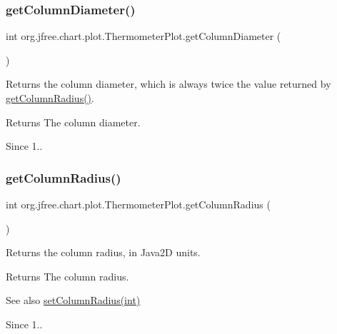 \subsubsection{\texorpdfstring{get\+Column\+Diameter()}{getColumnDiameter()}}
{\footnotesize\ttfamily int org.\+jfree.\+chart.\+plot.\+Thermometer\+Plot.\+get\+Column\+Diameter (\begin{DoxyParamCaption}{ }\end{DoxyParamCaption})}

Returns the column diameter, which is always twice the value returned by \mbox{\hyperlink{classorg_1_1jfree_1_1chart_1_1plot_1_1_thermometer_plot_a74b63300dd2a147c902542e3b3c98085}{get\+Column\+Radius()}}.

\begin{DoxyReturn}{Returns}
The column diameter.
\end{DoxyReturn}
\begin{DoxySince}{Since}
1.. 
\end{DoxySince}
\mbox{\label{classorg_1_1jfree_1_1chart_1_1plot_1_1_thermometer_plot_a74b63300dd2a147c902542e3b3c98085}} 
\subsubsection{\texorpdfstring{get\+Column\+Radius()}{getColumnRadius()}}
{\footnotesize\ttfamily int org.\+jfree.\+chart.\+plot.\+Thermometer\+Plot.\+get\+Column\+Radius (\begin{DoxyParamCaption}{ }\end{DoxyParamCaption})}

Returns the column radius, in Java2D units.

\begin{DoxyReturn}{Returns}
The column radius.
\end{DoxyReturn}
\begin{DoxySeeAlso}{See also}
\mbox{\hyperlink{classorg_1_1jfree_1_1chart_1_1plot_1_1_thermometer_plot_abdca1e8b671c03e4cfa948b622a93b29}{set\+Column\+Radius(int)}}
\end{DoxySeeAlso}
\begin{DoxySince}{Since}
1.. 
\end{DoxySince}
\mbox{\label{classorg_1_1jfree_1_1chart_1_1plot_1_1_thermometer_plot_a7521168336c8233ccb78d493a5612b81}} 
